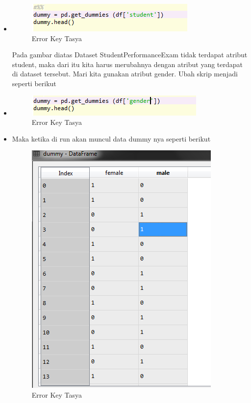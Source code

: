 \begin{itemize}
\item
\begin{figure}[ht]
\centering
\includegraphics[scale=0.5]{figures/praktektasyaeror2.png}
\caption{Error Key Tasya}
\label{Error}
\end{figure}
Pada gambar diatas Dataset StudentPerformanceExam tidak terdapat atribut student, maka dari itu kita harus merubahnya dengan atribut yang terdapat di dataset tersebut. Mari kita gunakan atribut gender. Ubah skrip menjadi seperti berikut
\item
\begin{figure}[ht]
\centering
\includegraphics[scale=0.5]{figures/praktektasyaeror3.png}
\caption{Error Key Tasya}
\label{Error}
\end{figure}
\item Maka ketika di run akan muncul data dummy nya seperti berikut
\begin{figure}[ht]
\centering
\includegraphics[scale=0.5]{figures/praktektasyaeror4.png}
\caption{Error Key Tasya}
\label{Error}
\end{figure}
\end{itemize}

